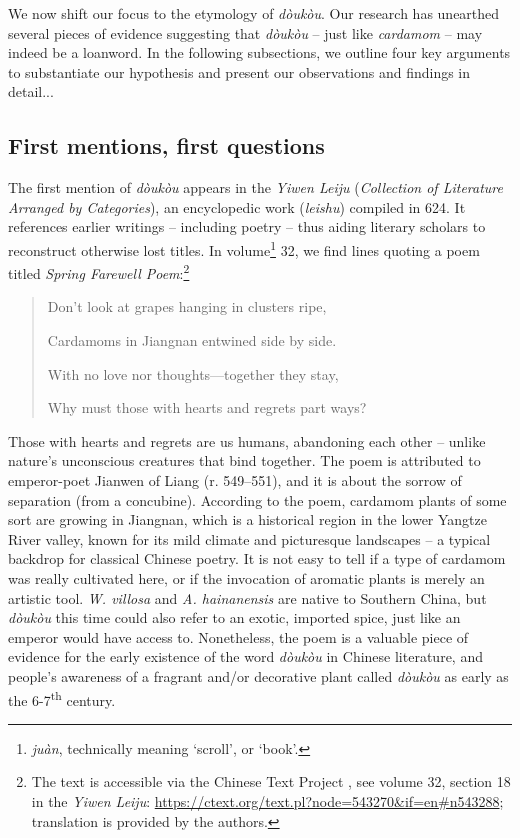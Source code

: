 \documentclass[12pt]{article}
\newcommand{\tc}[1]{\traditionalchinesefont{#1}\rmfamily}
\begin{document}
We now shift our focus to the etymology of \textit{dòukòu}. Our research has unearthed several pieces of evidence suggesting that \textit{dòukòu} -- just like \textit{cardamom} -- may indeed be a loanword. In the following subsections, we outline four key arguments to substantiate our hypothesis and present our observations and findings in detail...

\subsection{First mentions, first questions}


The first mention of \tc{荳蔻} \textit{dòukòu} appears in the \tc{藝文類聚} \textit{Yiwen Leiju} (\textit{Collection of Literature Arranged by Categories}), an encyclopedic work (\textit{leishu}) compiled in 624. It references earlier writings -- including poetry -- thus aiding literary scholars to reconstruct otherwise lost titles. In volume\footnote{\tc{卷} \textit{juàn}, technically meaning `scroll', or `book'.} 32, we find lines quoting a poem titled \tc{春別詩} \textit{Spring Farewell Poem}:\footnote{The text is accessible via the Chinese Text Project \parencite{sturgeon_2021_chinese}, see volume 32, section 18 in the \textit{Yiwen Leiju}: \url{https://ctext.org/text.pl?node=543270\&if=en\#n543288}; translation is provided by the authors.}

\begin{quote}

\tc{別觀蒲萄帶實垂，} Don't look at grapes hanging in clusters ripe,

\tc{江南\textcolor{accent}{荳蔻}生連枝，} Cardamoms in Jiangnan entwined side by side.

\tc{無情無意又如此，} With no love nor thoughts---together they stay,

\tc{有心有恨徒別離。} Why must those with hearts and regrets part ways?

\end{quote}

Those with hearts and regrets are us humans, abandoning each other -- unlike nature's unconscious creatures that bind together. The poem is attributed to emperor-poet Jianwen of Liang (r. 549--551), and it is about the sorrow of separation (from a concubine). According to the poem, cardamom plants of some sort are growing in Jiangnan, which is a historical region in the lower Yangtze River valley, known for its mild climate and picturesque landscapes -- a typical backdrop for classical Chinese poetry. It is not easy to tell if a type of cardamom was really cultivated here, or if the invocation of aromatic plants is merely an artistic tool. \textit{W. villosa} and \textit{A. hainanensis} are native to Southern China, but \textit{dòukòu} this time could also refer to an exotic, imported spice, just like an emperor would have access to. Nonetheless, the poem is a valuable piece of evidence for the early existence of the word \textit{dòukòu} in Chinese literature, and people's awareness of a fragrant and/or decorative plant called \textit{dòukòu} as early as the 6-7\textsuperscript{th} century.
\end{document}
